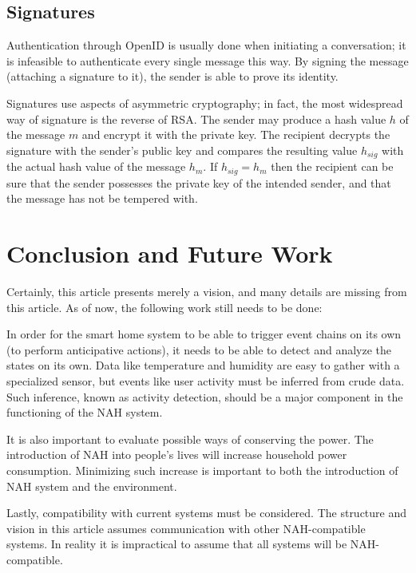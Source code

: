 \documentclass[letterpaper, twocolumn, 10pt, conference]{IEEEtran}
\begin{document}
\subsection{Signatures} \label{sec:signatures}

Authentication through OpenID is usually done when initiating a conversation; it is infeasible to authenticate every single message this way. By signing the message (attaching a signature to it), the sender is able to prove its identity. 

Signatures use aspects of asymmetric cryptography; in fact, the most widespread way of signature is the reverse of RSA. The sender may produce a hash value $h$ of the message $m$ and encrypt it with the private key. The recipient decrypts the signature with the sender's public key and compares the resulting value $h_{sig}$ with the actual hash value of the message $h_m$. If $ h_{sig} = h_m $ then the recipient can be sure that the sender possesses the private key of the intended sender, and that the message has not be tempered with.

\section{Conclusion and Future Work} \label{sec:conclusion}

Certainly, this article presents merely a vision, and many details are missing from this article. As of now, the following work still needs to be done:

In order for the smart home system to be able to trigger event chains on its own (to perform anticipative actions), it needs to be able to detect and analyze the states on its own. Data like temperature and humidity are easy to gather with a specialized sensor, but events like user activity must be inferred from crude data. Such inference, known as activity detection, should be a major component in the functioning of the NAH system.

It is also important to evaluate possible ways of conserving the power. The introduction of NAH into people's lives will increase household power consumption. Minimizing such increase is important to both the introduction of NAH system and the environment.

Lastly, compatibility with current systems must be considered. The structure and vision in this article assumes communication with other NAH-compatible systems. In reality it is impractical to assume that all systems will be NAH-compatible. 

\printbibliography
\end{document}
